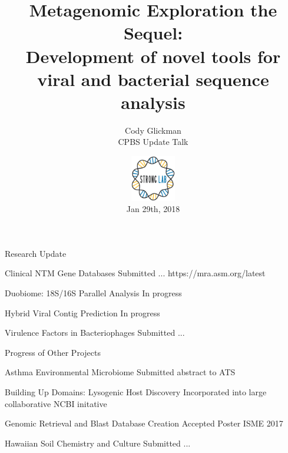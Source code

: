 \documentclass[11pt]{beamer}
\author{Cody Glickman \\ CPBS Update Talk}
\title{Metagenomic Exploration the Sequel: \\ Development of novel tools for viral and bacterial sequence analysis}
\date{ \includegraphics[height=2cm, width=2cm]{lablogo.png} \\ Jan 29th, 2018}
\begin{document}
	\maketitle
	\begin{frame}{Research Update}
	\begin{block}{\alert{Clinical NTM Gene Databases}}
	Submitted ...
	https://mra.asm.org/latest 
	\end{block}
	
	\begin{block}{\alert{Duobiome: 18S/16S Parallel Analysis}}
	In progress
	\end{block}
	
	\begin{block}{\alert{Hybrid Viral Contig Prediction}}
	In progress
	\end{block}
	
	\begin{block}{\alert{Virulence Factors in Bacteriophages}}
	Submitted ...
	\end{block}
	\end{frame}
	
	\begin{frame}{Progress of Other Projects}
	\begin{block}{Asthma Environmental Microbiome}
	Submitted abstract to ATS
	\end{block}
	
	\begin{block}{Building Up Domains: Lysogenic Host Discovery}
	Incorporated into large collaborative NCBI initative
	\end{block}
	
	\begin{block}{Genomic Retrieval and Blast Database Creation}
	Accepted Poster ISME 2017
	\end{block}
	
	\begin{block}{Hawaiian Soil Chemistry and Culture}
	Submitted ...
	\end{block}
	

	\end{frame}
\section{}
\end{document}
